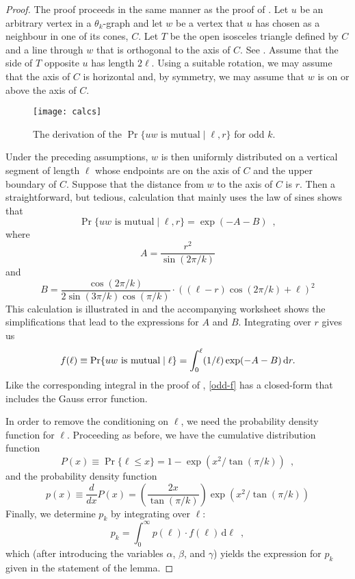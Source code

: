 \documentclass{patmorin}
\begin{document}
\begin{proof}
  The proof proceeds in the same manner as the proof of .
  Let $u$ be an arbitrary vertex in a $\theta_k$-graph and let $w$ be
  a vertex that $u$ has chosen as a neighbour in one of its cones, $C$.
  Let $T$ be the open isosceles triangle defined by $C$ and a line through
  $w$ that is orthogonal to the axis of $C$. See .
  Assume that the side of $T$ opposite $u$ has length $2\ell$.  Using a
  suitable rotation, we may assume that the axis of $C$ is horizontal and,
  by symmetry, we may assume that $w$ is on or above the axis of $C$.
 
  \begin{figure}
    \texttt{[image: calcs]}
    \caption{The derivation of the $\Pr\{\mbox{$uw$ is mutual}\mid \ell,r\}$
             for odd $k$.}
  \end{figure}
  Under the preceding assumptions, $w$ is then uniformly distributed on
  a vertical segment of length $\ell$ whose endpoints are on the axis
  of $C$ and the upper boundary of $C$.  Suppose that the distance from
  $w$ to the axis of $C$ is $r$.  Then a straightforward, but tedious,
  calculation that mainly uses the law of sines shows that
  \[
      \Pr\{\mbox{$uw$ is mutual}\mid \ell, r\} = \exp(-A-B) \enspace ,
  \]
  where
  \[ 
      A = \frac{r^2}{\sin(2\pi/k)}
  \]
  and
  \[
      B = \frac{\cos(2\pi/k)}{2\sin(3\pi/k)\cos(\pi/k)}\cdot\left((\ell-r)\cos(2\pi/k)+\ell\right)^2
  \]
  This calculation is illustrated in  and the
  accompanying worksheet shows the simplifications that lead to the
  expressions for $A$ and $B$.  Integrating over $r$ gives us
  \begin{equation}
    f(\ell)\equiv \Pr\{\mbox{$uw$ is mutual}\mid \ell\} = 
      \int_0^\ell (1/\ell)\exp(-A-B)\,\mathrm{d}r . \eqlabel{odd-f}
  \end{equation}
  Like the corresponding integral in the proof of ,
  \eqref{odd-f} has a closed-form that includes the Gauss error function.

  In order to remove the conditioning on $\ell$, we need the probability
  density function for $\ell$.  Proceeding as before, we have the
  cumulative distribution function
  \[
     P(x) \equiv \Pr\{\ell\le x\} 
          = 1 - \exp(x^2/\tan(\pi/k)) \enspace ,
  \]
  and the probability density function
  \[
    p(x)\equiv \frac{d}{dx}P(x) = 
     \left(\frac{2x}{\tan(\pi/k)}\right)
      \exp(x^2/\tan(\pi/k))
  \]
  Finally, we determine $p_k$ by integrating over $\ell$:
  \[
     p_k = \int_0^\infty p(\ell)\cdot f(\ell)\, \mathrm{d}{\ell} \enspace ,
  \]
  which (after introducing the variables $\alpha$, $\beta$, and $\gamma$)
  yields the expression for $p_k$ given in the statement of the lemma.
\end{proof}
\end{document}

